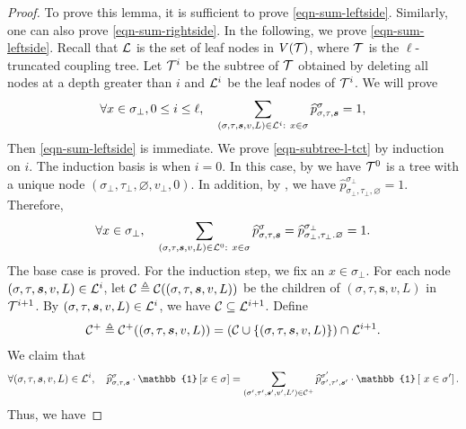 \documentclass[11pt]{article}
\newcommand{\id}[1]{\mathbb{1}\left[#1\right]}
\newcommand{\seqS}{\boldsymbol{s}}
\begin{document}
\begin{proof}
    To prove this lemma, it is sufficient to prove \eqref{eqn-sum-leftside}. Similarly, one can also prove \eqref{eqn-sum-rightside}.
    In the following, we prove \eqref{eqn-sum-leftside}.
    Recall that $\mathcal{L}$ is the set of leaf nodes in $V(\mathcal{T})$, where $\mathcal{T}$ is the $\ell$-truncated coupling tree. 
    Let $\mathcal{T}^{i}$ be the subtree of $\mathcal{T}$ obtained by deleting all nodes at a depth greater than $i$
    and $\mathcal{L}^{i}$ be the leaf nodes of $\mathcal{T}^{i}$.
    We will prove 
    \begin{align}\label{eqn-subtree-l-tct}
        \forall x\in \sigma_\bot,0\leq i\leq \ell, \quad \sum_{(\sigma,\tau, \seqS,v,L)\in \+L^i: \ x\in \sigma} \widehat{p}^{\sigma}_{\sigma,\tau,\seqS}=1,
    \end{align}
    Then \eqref{eqn-sum-leftside} is immediate.    
    We prove \eqref{eqn-subtree-l-tct} by induction on $i$.
    The induction basis is when $i = 0$.
    In this case, by  we have $\mathcal{T}^0$ is a tree with a unique node $(\sigma_\bot, \tau_\bot, \varnothing, v_\bot, 0)$.
    In addition, by , we have 
    $\widehat{p}^{\sigma_\bot}_{\sigma_\bot,\tau_\bot, \varnothing} = 1$.
    Therefore, 
     \begin{align*}
        \forall x\in \sigma_\bot, \quad \sum_{(\sigma,\tau, \seqS,v,L)\in \+L^0: \ x\in \sigma} \widehat{p}^{\sigma}_{\sigma,\tau,\seqS}=\widehat{p}^{\sigma_\bot}_{\sigma_\bot,\tau_\bot. \varnothing} = 1.
    \end{align*}
    The base case is proved. For the induction step, we fix an $x\in \sigma_\bot$.    
    For each node $(\sigma,\tau,\seqS,v,L)\in \+L^i$,
    let $\+C \triangleq \+C((\sigma,\tau,\seqS,v,L))$ be the children of $(\sigma,\tau,\seqS,v,L)$ in $\mathcal{T}^{i+1}$. 
    By $(\sigma,\tau,\seqS,v,L) \in \+L^{i}$, we have 
    $\mathcal{C}\subseteq \mathcal{L}^{i+1}$.
    Define 
    \begin{align}\label{def-cplus}
    \+C^{+} \triangleq \+C^{+}((\sigma,\tau,\seqS,v,L)) = \left(\+C\cup \{(\sigma,\tau,\seqS,v,L)\}\right)\cap \+L^{i+1}.
    \end{align}
    We claim that 
    \begin{align}\label{eq-extension-sum}
    \forall (\sigma,\tau,\seqS,v,L)\in \+L^i,\quad \widehat{p}^{\sigma}_{\sigma,\tau,\seqS}\cdot \id{x \in \sigma} = \sum_{(\sigma',\tau', \seqS',v',L')\in \+C^{+}} \widehat{p}^{\sigma'}_{\sigma',\tau',\seqS'}\cdot \id{\ x\in \sigma'}.
    \end{align}
    Thus, we have 

\end{proof}
\end{document}
